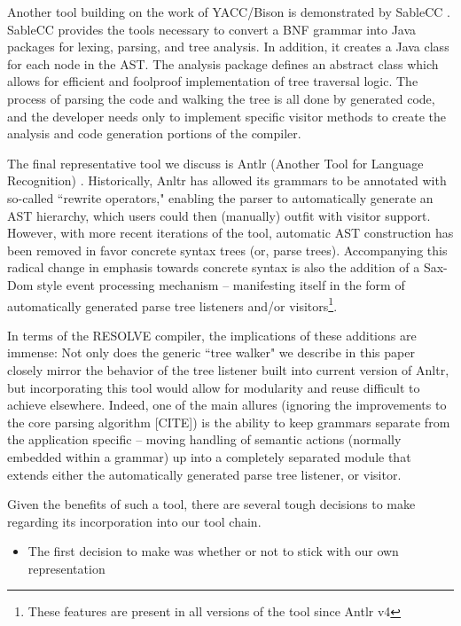\documentclass[times]{speauth}
\begin{document}
Another tool building on the work of YACC/Bison is demonstrated by SableCC \cite{gagnon:1998}. SableCC provides the tools necessary to convert a BNF grammar into Java packages for lexing, parsing, and tree analysis. In addition, it creates a Java class for each node in the AST. The analysis package defines an abstract class which allows for efficient and foolproof implementation of tree traversal logic. The process of parsing the code and walking the tree is all done by generated code, and the developer needs only to implement specific visitor methods to create the analysis and code generation portions of the compiler.

The final representative tool we discuss is Antlr (Another Tool for Language Recognition) \cite{parr:2011}. Historically, Anltr has allowed its grammars to be annotated with so-called ``rewrite operators," enabling the parser to automatically generate an AST hierarchy, which users could then (manually) outfit with visitor support. However, with more recent iterations of the tool, automatic AST construction has been removed in favor concrete syntax trees (or, parse trees). Accompanying this radical change in emphasis towards concrete syntax is also the addition of a Sax-Dom style event processing mechanism -- manifesting itself in the form of automatically generated parse tree listeners and/or visitors\footnote{These features are present in all versions of the tool since Antlr v4}. 

In terms of the RESOLVE compiler, the implications of these additions are immense: Not only does the generic ``tree walker" we describe in this paper closely mirror the behavior of the tree listener built into current version of Anltr, but incorporating this tool would allow for modularity and reuse difficult to achieve elsewhere. Indeed, one of the main allures (ignoring the improvements to the core parsing algorithm [CITE]) is the ability to keep grammars separate from the application specific -- moving handling of semantic actions (normally embedded within a grammar) up into a completely separated module that extends either the automatically generated parse tree listener, or visitor.

Given the benefits of such a tool, there are several tough decisions to make regarding its incorporation into our tool chain.
\begin{itemize}
\item The first decision to make was whether or not to stick with our own representation 

\end{itemize}
\end{document}
